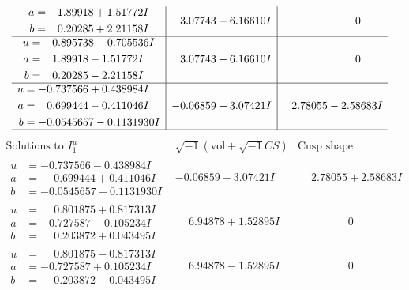 \documentclass[1p]{elsarticle_modified}
\theoremstyle{definition}
\newcommand{\I}{\sqrt{-1}}
\begin{document}
$$\begin{array}{c|c|c}
\begin{aligned}
a &= \phantom{-}1.89918 + 1.51772 I \\
b &= \phantom{-}0.20285 + 2.21158 I\end{aligned}
 & \phantom{-}3.07743 - 6.16610 I & \phantom{-0.000000 } 0 \\ \hline\begin{aligned}
u &= \phantom{-}0.895738 - 0.705536 I \\
a &= \phantom{-}1.89918 - 1.51772 I \\
b &= \phantom{-}0.20285 - 2.21158 I\end{aligned}
 & \phantom{-}3.07743 + 6.16610 I & \phantom{-0.000000 } 0 \\ \hline\begin{aligned}
u &= -0.737566 + 0.438984 I \\
a &= \phantom{-}0.699444 - 0.411046 I \\
b &= -0.0545657 - 0.1131930 I\end{aligned}
 & -0.06859 + 3.07421 I & \phantom{-}2.78055 - 2.58683 I\\
 \hline 
 \end{array}$$\newpage$$\begin{array}{c|c|c}  
\text{Solutions to }I^u_{1}& \I (\text{vol} + \sqrt{-1}CS) & \text{Cusp shape}\\
 \hline 
\begin{aligned}
u &= -0.737566 - 0.438984 I \\
a &= \phantom{-}0.699444 + 0.411046 I \\
b &= -0.0545657 + 0.1131930 I\end{aligned}
 & -0.06859 - 3.07421 I & \phantom{-}2.78055 + 2.58683 I \\ \hline\begin{aligned}
u &= \phantom{-}0.801875 + 0.817313 I \\
a &= -0.727587 - 0.105234 I \\
b &= \phantom{-}0.203872 + 0.043495 I\end{aligned}
 & \phantom{-}6.94878 + 1.52895 I & \phantom{-0.000000 } 0 \\ \hline\begin{aligned}
u &= \phantom{-}0.801875 - 0.817313 I \\
a &= -0.727587 + 0.105234 I \\
b &= \phantom{-}0.203872 - 0.043495 I\end{aligned}
 & \phantom{-}6.94878 - 1.52895 I & \phantom{-0.000000 } 0 \\ \hline\begin{aligned}

\end{aligned}
\end{array}$$
\end{document}
